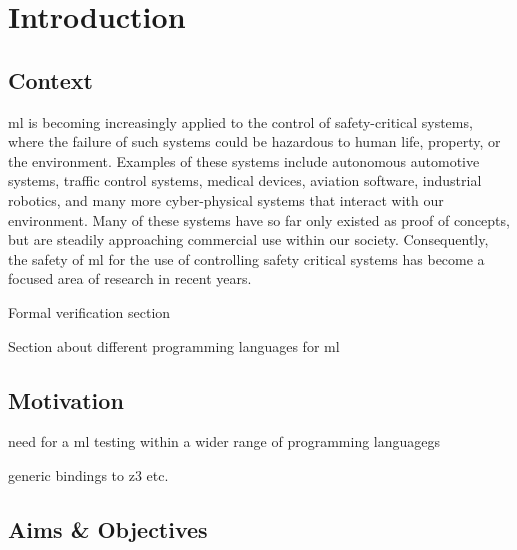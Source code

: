 
\chapter{Introduction} %
\label{Chapter1} %



\section{Context}

\Gls{ml} is becoming increasingly applied to the control of safety-critical systems, where the failure of such systems could be hazardous to human life, property, or the environment.
Examples of these systems include autonomous automotive systems, traffic control systems, medical devices, aviation software, industrial robotics, and many more cyber-physical systems that interact with our environment.
Many of these systems have so far only existed as proof of concepts, but are steadily approaching commercial use within our society.
Consequently, the safety of \gls{ml} for the use of controlling safety critical systems has become a focused area of research in recent years.

Formal verification section

Section about different programming languages for ml



\section{Motivation}


need for a ml testing within a wider range of programming languagegs

generic bindings to z3 etc.


\section{Aims \& Objectives}
